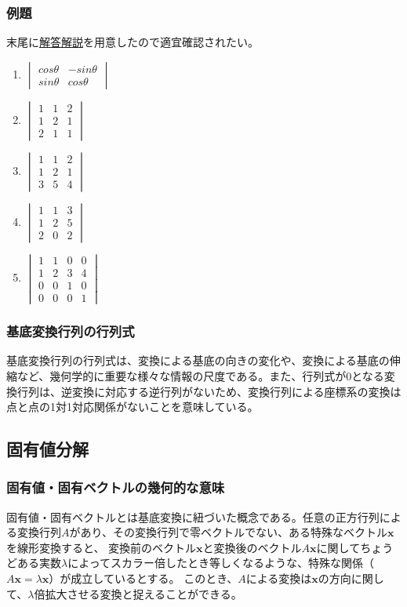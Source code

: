 \documentclass[10pt]{ujarticle}
\begin{document}
\subsubsection{例題}
末尾に\hyperlink{q1}{解答解説}を用意したので適宜確認されたい。
\begin{enumerate}
  \item $\begin{vmatrix} cos\theta & -sin\theta\\ sin\theta & cos\theta \end{vmatrix}$
  \item $\begin{vmatrix} 1 & 1 & 2 \\ 1 & 2 & 1 \\ 2 & 1 & 1 \end{vmatrix}$
  \item $\begin{vmatrix} 1 & 1 & 2 \\ 1 & 2 & 1 \\ 3 & 5 & 4 \end{vmatrix}$
  \item $\begin{vmatrix} 1 & 1 & 3 \\ 1 & 2 & 5 \\ 2 & 0 & 2 \end{vmatrix}$
  \item $\begin{vmatrix} 1 & 1 & 0 & 0 \\ 1 & 2 & 3 & 4 \\ 0 & 0 & 1 & 0 \\ 0 & 0 & 0 & 1\end{vmatrix}$
\end{enumerate}
\subsubsection{基底変換行列の行列式}
基底変換行列の行列式は、変換による基底の向きの変化や、変換による基底の伸縮など、幾何学的に重要な様々な情報の尺度である。また、行列式が0となる変換行列は、逆変換に対応する逆行列がないため、変換行列による座標系の変換は点と点の1対1対応関係がないことを意味している。

\hypertarget{eigen}{\subsection{固有値分解}}
\subsubsection{固有値・固有ベクトルの幾何的な意味}
固有値・固有ベクトルとは基底変換に紐づいた概念である。任意の正方行列による変換行列$A$があり、その変換行列で零ベクトルでない、ある特殊なベクトル$\mathbf{x}$を線形変換すると、
変換前のベクトル$\mathbf{x}$と変換後のベクトル$A\mathbf{x}$に関してちょうどある実数$\lambda$によってスカラー倍したとき等しくなるような、特殊な関係（$A\mathbf{x}=\lambda\mathbf{x}$）が成立しているとする。
このとき、$A$による変換は$\mathbf{x}$の方向に関して、$\lambda$倍拡大させる変換と捉えることができる。
\end{document}
